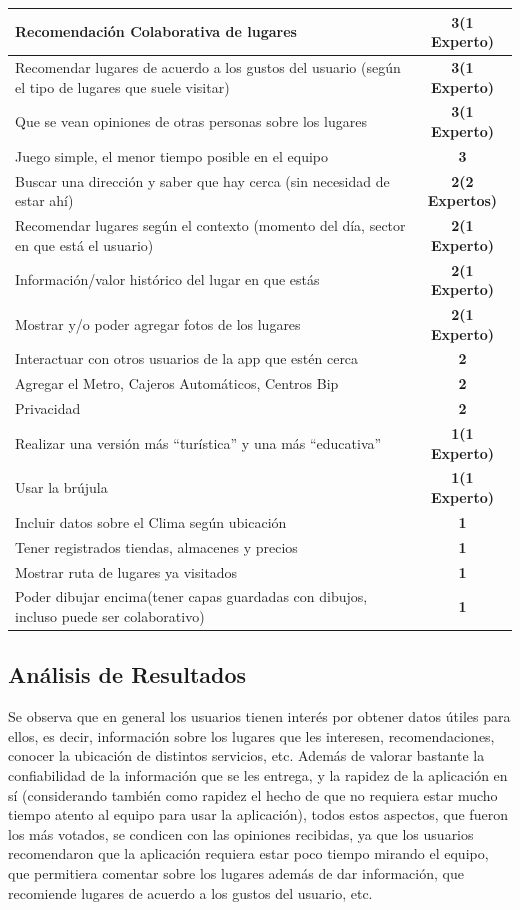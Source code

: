 \documentclass[10pt,letterpaper]{article}
\begin{document}
\begin{tabular}{| p{10cm} | c |}
\hline
Recomendación Colaborativa de lugares & \textbf{3(1 Experto)} \\ \hline
Recomendar lugares de acuerdo a los gustos del usuario (según el tipo de lugares que suele visitar) & \textbf{3(1 Experto)} \\ \hline
Que se vean opiniones de otras personas sobre los lugares & \textbf{3(1 Experto)} \\ \hline
Juego simple, el menor tiempo posible en el equipo & \textbf{3} \\ \hline
Buscar una dirección y saber que hay cerca (sin necesidad de estar ahí) & \textbf{2(2 Expertos)} \\ \hline
Recomendar lugares según el contexto (momento del día, sector en que está el usuario) & \textbf{2(1 Experto)} \\ \hline
Información/valor histórico del lugar en que estás & \textbf{2(1 Experto)} \\ \hline
Mostrar y/o poder agregar fotos de los lugares & \textbf{2(1 Experto)} \\ \hline
Interactuar con otros usuarios de la app que estén cerca & \textbf{2} \\ \hline
Agregar el Metro, Cajeros Automáticos, Centros Bip & \textbf{2} \\ \hline
Privacidad & \textbf{2} \\ \hline
Realizar una versión más “turística” y una más “educativa” & \textbf{1(1 Experto)} \\ \hline
Usar la brújula & \textbf{1(1 Experto)} \\ \hline
Incluir datos sobre el Clima según ubicación & \textbf{1} \\ \hline
Tener registrados tiendas, almacenes y precios & \textbf{1} \\ \hline
Mostrar ruta de lugares ya visitados & \textbf{1} \\ \hline
Poder dibujar encima(tener capas guardadas con dibujos, incluso puede ser colaborativo) & \textbf{1} \\ \hline
\end{tabular}

\subsection{Análisis de Resultados}

Se observa que en general los usuarios tienen interés por obtener datos útiles para ellos, es decir, información sobre los lugares que les interesen, recomendaciones, conocer la ubicación de distintos servicios, etc. Además de valorar bastante la confiabilidad de la información que se les entrega, y la rapidez de la aplicación en sí (considerando también como rapidez el hecho de que no requiera estar mucho tiempo atento al equipo para usar la aplicación), todos estos aspectos, que fueron los más votados, se condicen con las opiniones recibidas, ya que los usuarios recomendaron que la aplicación requiera estar poco tiempo mirando el equipo, que permitiera comentar sobre los lugares además de dar información, que recomiende lugares de acuerdo a los gustos del usuario, etc.\\
\end{document}
